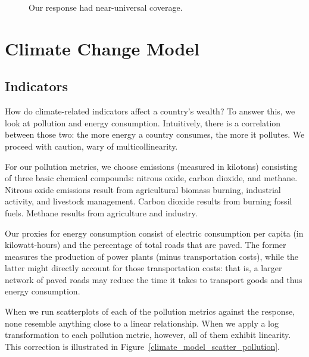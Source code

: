 \documentclass[11pt]{article}
\begin{document}
\begin{figure}[!ht]
  \centering
  \caption{\label{gdp_per_capita_heat_map}Our response had near-universal coverage.}
\end{figure}









\section{Climate Change Model}
\label{sec:model_climate}

\subsection{Indicators}
How do climate-related indicators affect a country's wealth? To answer this, we look at pollution and energy consumption. Intuitively, there is a correlation between those two: the more energy a country consumes, the more it pollutes. We proceed with caution, wary of multicollinearity.

For our pollution metrics, we choose emissions (measured in kilotons) consisting of three basic chemical compounds: nitrous oxide, carbon dioxide, and methane. Nitrous oxide emissions result from agricultural biomass burning, industrial activity, and livestock management. Carbon dioxide results from burning fossil fuels. Methane results from agriculture and industry.

Our proxies for energy consumption consist of electric consumption per capita (in kilowatt-hours) and the percentage of total roads that are paved. The former measures the production of power plants (minus transportation costs), while the latter might directly account for those transportation costs: that is, a larger network of paved roads may reduce the time it takes to transport goods and thus energy consumption.

When we run scatterplots of each of the pollution metrics against the response, none resemble anything close to a linear relationship. When we apply a log transformation to each pollution metric, however, all of them exhibit linearity. This correction is illustrated in Figure~\ref{climate_model_scatter_pollution}.
\end{document}
